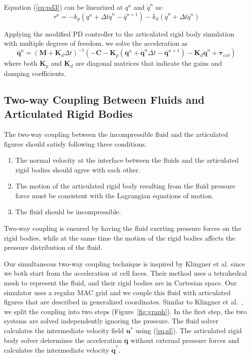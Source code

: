 Equation (\ref{eq:pd3}) can be linearized at $q^n$ and $\dot{q}^n$ as:
\begin{displaymath}
\tau^n=-k_p(q^n+\Delta t\dot{q}^n-\bar{q}^{n+1})-k_d(\dot{q}^n+\Delta t\ddot{q}^n)
\end{displaymath}

Applying the modified PD controller to the articulated rigid body simulation with multiple degrees of freedom, we solve the acceleration as
\begin{displaymath}
\label{eq:modifiedDynamics}
\mathbf{\ddot{q}}^n=(\mathbf{M}+\mathbf{K}_d\Delta t)^{-1}(-\mathbf{C}-\mathbf{K}_p(\mathbf{q}^n+\mathbf{\dot{q}}^n\Delta t-\bar{\mathbf{q}}^{n+1})-\mathbf{K}_d\mathbf{\dot{q}}^n+\mathbf{\tau}_{ext})
\end{displaymath}
where both $\mathbf{K}_p$ and $\mathbf{K}_d$ are diagonal matrices that indicate the gains and damping coefficients.

\subsection{Two-way Coupling Between Fluids and Articulated Rigid Bodies}
The two-way coupling between the incompressible fluid and the articulated figures should satisfy following three conditions.
\begin{enumerate}
\item The normal velocity at the interface between the fluids and the
articulated rigid bodies should agree with each other.
\item The motion of the articulated rigid body resulting from the fluid
pressure force must be consistent with the Lagrangian equations of motion.
\item The fluid should be incompressible.
\end{enumerate}

Two-way coupling is ensured by having the fluid exerting pressure forces
on the rigid bodies, while at the same time the motion of the rigid bodies
affects the pressure distribution of the fluid.

Our simultaneous two-way coupling technique is inspired by Klingner et al.
\cite{klingner2006mesh} since we both start from the acceleration at
cell faces.  Their method uses a tetrahedral mesh to represent the fluid,
and their rigid bodies are in Cartesian space.  Our simulator uses a
regular MAC grid and we couple this fluid with articulated figures that
are described in generalized coordinates.  Similar to Klingner et
al.~\cite{klingner2006mesh}, we split the coupling into two steps
(Figure~\ref{fig:graph}). In the first step, the two systems are solved
independently ignoring the pressure. The fluid solver calculates the
intermediate velocity field $\mathbf{u}^*$ using (\ref{eq:sl}). The articulated
rigid body solver determines the acceleration $\mathbf{\ddot{q}}$ without
external pressure forces and calculates the intermediate velocity
$\mathbf{\dot{q}}^*$.

